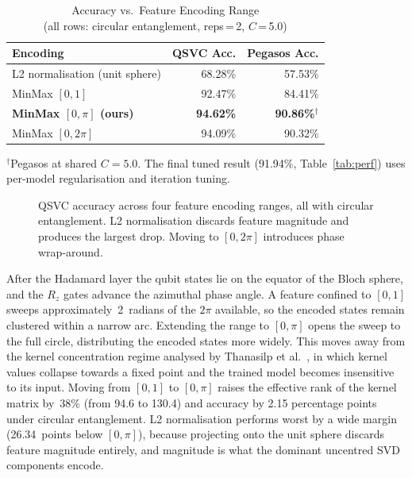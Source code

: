 \documentclass[10pt,conference]{IEEEtran}
\begin{document}
\begin{table}[t]
\caption{Accuracy vs.\ Feature Encoding Range\\
         (all rows: circular entanglement, reps\,=\,2, $C$\,=\,5.0)}
\label{tab:encoding}
\centering
\renewcommand{\arraystretch}{1.1}
\begin{tabular}{lrr}
\toprule
Encoding & QSVC Acc. & Pegasos Acc.\\
\midrule
L2 normalisation (unit sphere) & 68.28\% & 57.53\%\\
MinMax $[0,1]$                 & 92.47\% & 84.41\%\\
\textbf{MinMax $[0,\pi]$ (ours)} & \textbf{94.62\%} & \textbf{90.86\%}$^{\dagger}$\\
MinMax $[0,2\pi]$              & 94.09\% & 90.32\%\\
\bottomrule
\end{tabular}
\smallskip

\begin{flushleft}
{\footnotesize $^{\dagger}$Pegasos at shared $C\!=\!5.0$. The final
tuned result (91.94\%, Table~\ref{tab:perf}) uses per-model
regularisation and iteration tuning.}
\end{flushleft}
\end{table}

\begin{figure}[t]
  \centering
  \caption{QSVC accuracy across four feature encoding ranges, all with
    circular entanglement. L2 normalisation discards feature magnitude
    and produces the largest drop. Moving to $[0,2\pi]$ introduces
    phase wrap-around.}
  \label{fig:encoding}
\end{figure}

After the Hadamard layer the qubit states lie on the equator of the
Bloch sphere, and the $R_z$ gates advance the azimuthal phase angle. A
feature confined to $[0,1]$ sweeps approximately~2~radians of the
$2\pi$ available, so the encoded states remain clustered within a narrow
arc. Extending the range to $[0,\pi]$ opens the sweep to the full
circle, distributing the encoded states more widely. This moves away
from the kernel concentration regime analysed by Thanasilp
et al.~\cite{thanasilp2024}, in which kernel values collapse towards a
fixed point and the trained model becomes insensitive to its input.
Moving from $[0,1]$ to $[0,\pi]$ raises the effective rank of the
kernel matrix by~38\% (from 94.6 to 130.4) and accuracy by 2.15
percentage points under circular entanglement. L2 normalisation performs
worst by a wide margin (26.34~points below $[0,\pi]$), because
projecting onto the unit sphere discards feature magnitude entirely, and
magnitude is what the dominant uncentred SVD components encode.
\end{document}
